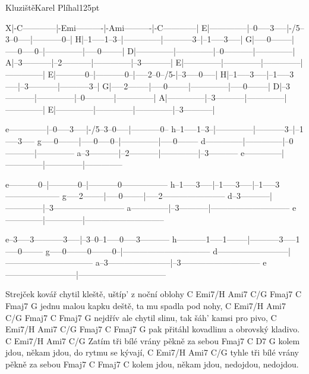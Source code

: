 \begin{song}{Kluziště}{Karel Plíhal}{125pt}

\tabs{20pt}
X|-C------------|-Emi----------|-Ami----------|-C------------|
E|--------------|--0-----3-----|-/5--3--0-----|-----------0--|
H|--1-----1--3--|--------------|-----------3--|--1-----3-----|
G|-----0--------|-----0-----0--|--------------|-----0--------|
D|--------------|--------------|--0-----------|--------------|
A|--3-----------|--2-----------|--------------|--3-----------|
E|--------------|--------------|--------------|--------------|
\endtabs
\tabs{20pt}
E|-----------0--|-----------0--|-----2--0--/5-|--3-----0-----|
H|--1-----3-----|--1-----3-----|--3-----------|-----------3--|
G|-----2--------|-----0--------|--------------|-----0--------|
D|--3-----------|--------------|--0-----------|--------------|
A|--------------|--3-----------|--------------|--------------|
E|--------------|--------------|--------------|--3-----------|
\endtabs

\tabs{20pt}
e--------------|--0-----3-----|-/5--3--0-----|-----------0--
h--1-----1--3--|--------------|-----------3--|--1-----3-----
g-----0--------|-----0-----0--|--------------|-----0--------
d--------------|--------------|--0-----------|--------------
a--3-----------|--2-----------|--------------|--3-----------
e--------------|--------------|--------------|--------------
\endtabs

\tabs{20pt}
e-----------0--|-----------0--|-----------0-----------------
h--1-----3-----|--1-----3-----|--1-----3--------------------
g-----2--------|-----0--------|-----2-----------------------
d--3-----------|--------------|--3--------------------------
a--------------|--3-----------|-----------------------------
e--------------|--------------|-----------------------------
\endtabs

\tabs{20pt}
e--3-----3-----------3-----|--3--0--1-----0-----3-----------
h-----------1-----1--------|-----------3-----1-----0--------
g-----0--------0--------0--|--------------------------------
d--------------------------|--------------------------------
a--3-----------------------|--3-----------------------------
e--------------------------|--------------------------------
\endtabs

%
Strejček kovář chytil kleště, uštíp' z noční oblohy
    C     Emi7/H Ami7 C/G    Fmaj7  C     Fmaj7 G
   jednu malou kapku deště, ta mu spadla pod nohy,
    C      Emi7/H Ami7  C/G   Fmaj7    C      Fmaj7 G
   nejdřív ale chytil slinu, tak šáh' kamsi pro pivo,
    C      Emi7/H Ami7 C/G Fmaj7 C      Fmaj7 G
   pak přitáhl kovadlinu a obrovský kladivo.
           C        Emi7/H Ami7     C/G
\chorus%
Zatím tři bílé vrány pěkně za sebou
           Fmaj7       C          D7        G
   kolem jdou, někam jdou, do rytmu se kývají,
           C        Emi7/H Ami7     C/G
   tyhle tři bílé vrány pěkně za sebou
           Fmaj7       C         Fmaj7     C
   kolem jdou, někam jdou, nedojdou, nedojdou.


\end{song}
